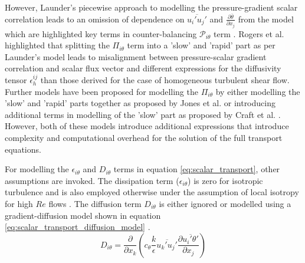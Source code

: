 However, Launder's piecewise approach to modelling the pressure-gradient scalar correlation leads to an omission of dependence on $\overline{u_{i}'u_{j}'}$ and $\frac{\partial \overline{\theta}}{\partial x_{j}}$ from the model which are highlighted key terms in counter-balancing $\mathcal{P}_{i\theta}$ term \cite{Younis2005}. Rogers et al. \cite{Rogers1989} highlighted that splitting the $\Pi_{i\theta}$ term into a 'slow' and 'rapid' part as per Launder's model leads to misalignment between pressure-scalar gradient correlation and scalar flux vector and different expressions for the diffusivity tensor $\epsilon_{h}^{ij}$ than those derived for the case of homogeneous turbulent shear flow. Further models have been proposed for modelling the $\Pi_{i\theta}$ by either modelling the 'slow' and 'rapid' parts together as proposed by Jones et al. \cite{Jones1988} or introducing additional terms in modelling of the 'slow' part as proposed by Craft et al. \cite{Craft1989}. However, both of these models introduce additional expressions that introduce complexity and computational overhead for the solution of the full transport equations. 

For modelling the $\epsilon_{i\theta}$ and $D_{i\theta}$ terms in equation \ref{eq:scalar_transport}, other assumptions are invoked. The dissipation term ($\epsilon_{i\theta}$) is zero for isotropic turbulence and is also employed otherwise under the assumption of local isotropy for high $Re$ flows \cite{Younis2005} \cite{Wikstrom1998} \cite{Combest2011}. The diffusion term $D_{i\theta}$ is either ignored or modelled using a gradient-diffusion model shown in equation \ref{eq:scalar_transport_diffusion_model} \cite{Wikstrom1998}.
\begin{equation}
\label{eq:scalar_transport_diffusion_model}
D_{i\theta} = \frac{\partial}{\partial x_{k}}\left(c_{\theta}\frac{k}{\epsilon}\overline{u_{k}'u_{j}'}\frac{\partial \overline{u_{i}'\theta'}}{\partial x_{j}}\right)
\end{equation}
 